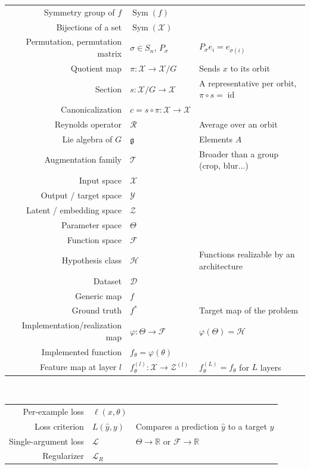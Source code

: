\documentclass[mathematics,review,submit,moreauthors]{Definitions/mdpi}
\begin{document}
{\begin{tabularx}{\linewidth}{@{}N@{}}
Symmetry group of $f$ & $\operatorname{Sym}(f)$ & \\
Bijections of a set & $\operatorname{Sym}(\mathcal{X})$ & \\
Permutation, permutation matrix & $\sigma\in S_n$, $P_\sigma$ & ${P_\sigma e_i=e_{\sigma(i)}}$ \\
Quotient map & ${\pi:\mathcal{X}\to\mathcal{X}/G}$ & Sends $x$ to its orbit \\
Section & ${s:\mathcal{X}/G\to\mathcal{X}}$ & A representative per orbit, ${\pi\circ s=\operatorname{id}}$ \\
Canonicalization & ${c=s\circ\pi:\mathcal{X}\to\mathcal{X}}$ & \\
Reynolds operator & $\mathcal{R}$ & Average over an orbit \\
Lie algebra of $G$ & $\mathfrak{g}$ & Elements $A$ \\
Augmentation family & $\mathcal{T}$ & Broader than a group (crop, blur...) \\
\midrule
Input space & $\mathcal{X}$ & \\
Output / target space & $\mathcal{Y}$ & \\
Latent / embedding space & $\mathcal{Z}$ & \\
Parameter space & $\Theta$ & \\
Function space & $\mathcal{F}$ & \\
Hypothesis class & $\mathcal{H}$ & Functions realizable by an architecture \\
Dataset & $\mathcal{D}$ & \\
Generic map & $f$ & \\
Ground truth & $f^*$ & Target map of the problem \\
Implementation/realization map & ${\varphi:\Theta\to\mathcal{F}}$ & ${\varphi(\Theta)=\mathcal{H}}$ \\
Implemented function & ${f_\theta=\varphi(\theta)}$ & \\
Feature map at layer $l$ & ${f_\theta^{(l)}:\mathcal{X}\to\mathcal{Z}^{(l)}}$ & ${f_\theta^{(L)}=f_\theta}$ for $L$ layers \\
\midrule
\end{tabularx}\\
\noindent
\begin{tabularx}{\linewidth}{@{}N@{}}
Per-example loss & $\ell(x,\theta)$ & \\
Loss criterion & $L(\hat y,y)$ & Compares a prediction $\hat y$ to a target $y$ \\
Single-argument loss & $\mathcal{L}$ & ${\Theta\to\mathbb{R}}$ or ${\mathcal{F}\to\mathbb{R}}$\\
Regularizer & $\mathcal{L}_R$ &  \\
\bottomrule
\end{tabularx}}
\end{document}
